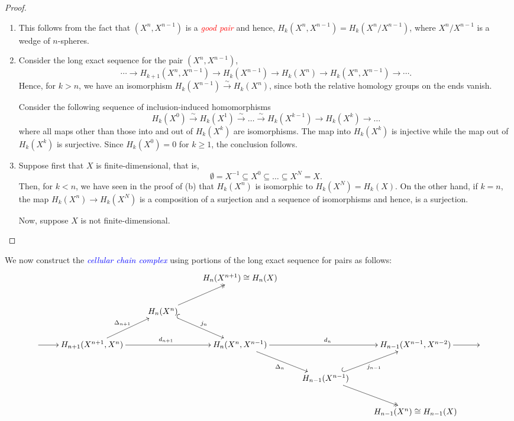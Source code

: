 \documentclass[10pt]{article}
\theoremstyle{thmstyle}
\theoremstyle{defstyle}
\newcommand{\define}[1]{\textcolor{blue}{\textit{#1}}}
\newcommand{\important}[1]{\textcolor{red}{\textit{#1}}}
\renewcommand{\ge}{\geqslant}
\begin{document}
\begin{proof}
\begin{enumerate}[label=(\alph*)]
    \item This follows from the fact that $(X^n, X^{n - 1})$ is a \important{good pair} and hence, $H_k(X^n, X^{n - 1}) = H_k(X^{n}/X^{n - 1})$, where $X^n/X^{n - 1}$ is a wedge of $n$-spheres.

    \item Consider the long exact sequence for the pair $(X^n, X^{n - 1})$, 
    \begin{equation*}
        \cdots\to H_{k + 1}(X^n, X^{n - 1})\to H_k(X^{n - 1})\to H_k(X^n)\to H_k(X^n, X^{n - 1})\to\cdots.
    \end{equation*}
    Hence, for $k > n$, we have an isomorphism $H_{k}(X^{n - 1})\xrightarrow{\sim} H_k(X^n)$, since both the relative homology groups on the ends vanish.

    Consider the following sequence of inclusion-induced homomorphisms
    \begin{equation*}
        H_k(X^0)\xrightarrow{\sim} H_k(X^1)\xrightarrow{\sim}\dots\xrightarrow{\sim} H_k(X^{k - 1})\to H_k(X^k)\to\dots
    \end{equation*}
    where all maps other than those into and out of $H_k(X^k)$ are isomorphisms. The map into $H_k(X^k)$ is injective while the map out of $H_k(X^k)$ is surjective. Since $H_k(X^0) = 0$ for $k\ge 1$, the conclusion follows.

    \item Suppose first that $X$ is finite-dimensional, that is, 
    \begin{equation*}
        \emptyset = X^{-1}\subseteq X^0\subseteq\dots\subseteq X^{N} = X.
    \end{equation*}
    Then, for $k < n$, we have seen in the proof of (b) that $H_k(X^n)$ is isomorphic to $H_k(X^N) = H_k(X)$. On the other hand, if $k = n$, the map $H_k(X^n)\to H_k(X^N)$ is a composition of a surjection and a sequence of isomorphisms and hence, is a surjection.

    Now, suppose $X$ is not finite-dimensional.\qedhere
\end{enumerate}
\end{proof}

We now construct the \define{cellular chain complex} using portions of the long exact sequence for pairs as follows: 
\begin{equation*}
    \xymatrix {
    & & & H_n(X^{n + 1})\cong H_n(X)\\
    & & H_n(X^n)\ar@{^{(}->}[rd]^{j_n}\ar@{->>}[ru]\\
    {}\ar[r] & H_{n + 1}(X^{n + 1}, X^n)\ar[rr]^{d_{n + 1}}\ar[ru]^{\Delta_{n + 1}} & & H_n(X^{n}, X^{n - 1})\ar[rr]^{d_n}\ar[rd]_{\Delta_{n}} & & H_{n - 1}(X^{n - 1}, X^{n - 2})\ar[r] & {}\\
    & & & & H_{n - 1}(X^{n - 1})\ar@{^{(}->}[ru]_{j_{n - 1}}\ar@{->>}[rd]\\
    & & & & & H_{n - 1}(X^n)\cong H_{n - 1}(X)
    }
\end{equation*}
\end{document}
